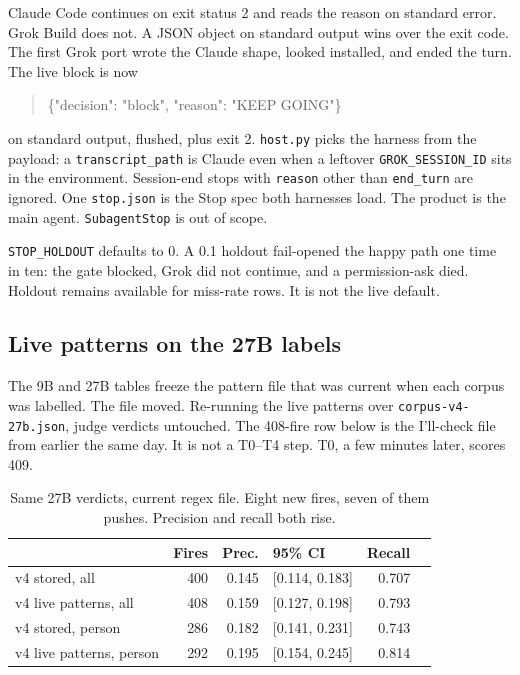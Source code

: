Claude Code continues on exit status 2 and reads the reason on
standard error. Grok Build does not. A JSON object on standard
output wins over the exit code. The first Grok port wrote the Claude
shape, looked installed, and ended the turn. The live block is now

\begin{quote}
\ttfamily\small
\{"decision": "block", "reason": "KEEP GOING"\}
\end{quote}

on standard output, flushed, plus exit 2. \texttt{host.py} picks the
harness from the payload: a \texttt{transcript\_path} is Claude even
when a leftover \texttt{GROK\_SESSION\_ID} sits in the environment.
Session-end stops with \texttt{reason} other than \texttt{end\_turn}
are ignored. One \texttt{stop.json} is the Stop spec both
harnesses load. The product is the main agent. \texttt{SubagentStop} is
out of scope.

\texttt{STOP\_HOLDOUT} defaults to 0. A 0.1 holdout fail-opened the
happy path one time in ten: the gate blocked, Grok did not continue,
and a permission-ask died. Holdout remains available for miss-rate
rows. It is not the live default.


\subsection{Live patterns on the 27B labels}
\label{sec:livepat}

The 9B and 27B tables freeze the pattern file that was current when
each corpus was labelled. The file moved. Re-running the live
patterns over \texttt{corpus-v4-27b.json}, judge verdicts untouched.
The 408-fire row below is the I'll-check file from earlier the same
day. It is not a T0--T4 step. T0, a few minutes later, scores 409.

\begin{table}[ht]
\centering
{\small\begin{tabular}{lrrlrr}
\toprule
 & Fires & Prec. & 95\% CI & Recall \\
\midrule
v4 stored, all & 400 & 0.145 & [0.114, 0.183] & 0.707 \\
v4 live patterns, all & 408 & 0.159 & [0.127, 0.198] & 0.793 \\
v4 stored, person & 286 & 0.182 & [0.141, 0.231] & 0.743 \\
v4 live patterns, person & 292 & 0.195 & [0.154, 0.245] & 0.814 \\
\bottomrule
\end{tabular}}
\caption{Same 27B verdicts, current regex file. Eight new fires, seven
of them pushes. Precision and recall both rise.}
\label{tab:livepat}
\end{table}

